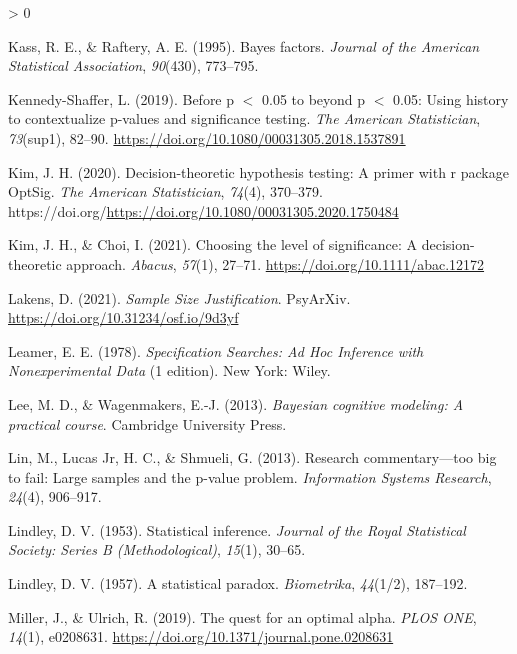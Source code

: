 \documentclass[
  english,
  ,man, a4paper,floatsintext]{apa6}
\newlength{\cslhangindent}
\newenvironment{CSLReferences}[2] %
 {%
  \setlength{\parindent}{0pt}
  \ifodd #1 \everypar{\setlength{\hangindent}{\cslhangindent}}\ignorespaces\fi
  \ifnum #2 > 0
  \setlength{\parskip}{#2\baselineskip}
  \fi
 }%
 {}
\begin{document}
\begin{CSLReferences}{1}{0}
\leavevmode\hypertarget{ref-kass1995bayes}{}%
Kass, R. E., \& Raftery, A. E. (1995). Bayes factors. \emph{Journal of the American Statistical Association}, \emph{90}(430), 773--795.

\leavevmode\hypertarget{ref-kennedy-shaffer_before_2019}{}%
Kennedy-Shaffer, L. (2019). Before p {\(<\)} 0.05 to beyond p {\(<\)} 0.05: Using history to contextualize p-values and significance testing. \emph{The American Statistician}, \emph{73}(sup1), 82--90. \url{https://doi.org/10.1080/00031305.2018.1537891}

\leavevmode\hypertarget{ref-kim2020decision}{}%
Kim, J. H. (2020). Decision-theoretic hypothesis testing: A primer with r package OptSig. \emph{The American Statistician}, \emph{74}(4), 370--379. https://doi.org/\url{https://doi.org/10.1080/00031305.2020.1750484}

\leavevmode\hypertarget{ref-kim2021choosing}{}%
Kim, J. H., \& Choi, I. (2021). Choosing the level of significance: A decision-theoretic approach. \emph{Abacus}, \emph{57}(1), 27--71. \url{https://doi.org/10.1111/abac.12172}

\leavevmode\hypertarget{ref-lakens_sample_2021}{}%
Lakens, D. (2021). \emph{Sample {Size} {Justification}}. PsyArXiv. \url{https://doi.org/10.31234/osf.io/9d3yf}

\leavevmode\hypertarget{ref-leamer_specification_1978}{}%
Leamer, E. E. (1978). \emph{Specification {Searches}: {Ad Hoc Inference} with {Nonexperimental Data}} (1 edition). {New York}: {Wiley}.

\leavevmode\hypertarget{ref-LeeWagenmakersBayesBook}{}%
Lee, M. D., \& Wagenmakers, E.-J. (2013). \emph{Bayesian cognitive modeling: {A} practical course}. Cambridge University Press.

\leavevmode\hypertarget{ref-lin2013research}{}%
Lin, M., Lucas Jr, H. C., \& Shmueli, G. (2013). Research commentary---too big to fail: Large samples and the p-value problem. \emph{Information Systems Research}, \emph{24}(4), 906--917.

\leavevmode\hypertarget{ref-lindley1953statistical}{}%
Lindley, D. V. (1953). Statistical inference. \emph{Journal of the Royal Statistical Society: Series B (Methodological)}, \emph{15}(1), 30--65.

\leavevmode\hypertarget{ref-lindley_statistical_1957}{}%
Lindley, D. V. (1957). A statistical paradox. \emph{Biometrika}, \emph{44}(1/2), 187--192.

\leavevmode\hypertarget{ref-miller_quest_2019}{}%
Miller, J., \& Ulrich, R. (2019). The quest for an optimal alpha. \emph{PLOS ONE}, \emph{14}(1), e0208631. \url{https://doi.org/10.1371/journal.pone.0208631}


\end{CSLReferences}
\end{document}
